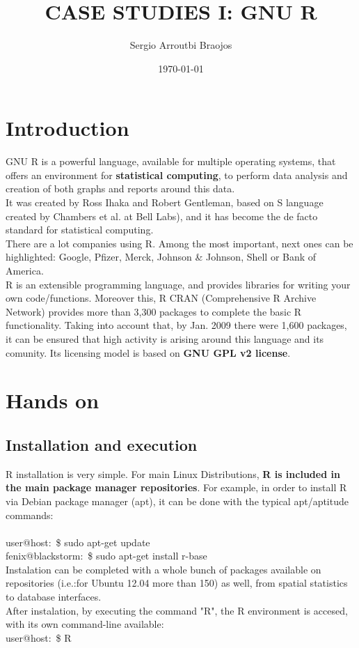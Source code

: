 \documentclass[11pt]{article}
\title{\textbf{CASE STUDIES I: GNU R}}
\author{Sergio Arroutbi Braojos}
\date{\today}
\begin{document}
\maketitle

\section{Introduction}
GNU R is a powerful language, available for multiple operating systems, that offers an environment for \textbf{statistical computing}, to perform data analysis and creation of both graphs and reports around this data.\\
It was created by Ross Ihaka and Robert Gentleman, based on S language created by Chambers et al. at Bell Labs), and it has become the de facto standard for statistical computing.\\
There are a lot companies using R. Among the most important, next ones can be highlighted: Google, Pfizer, Merck, Johnson \& Johnson, Shell or Bank of America.\\
R is an extensible programming language, and provides libraries for writing your own code/functions. Moreover this, R CRAN (Comprehensive R Archive Network) provides more than 3,300 packages to complete the basic R functionality. Taking into account that, by Jan. 2009 there were 1,600 packages, it can be ensured that high activity is arising around this language and its comunity. Its licensing model is based on \textbf{GNU GPL v2 license}.

\section{Hands on}
\subsection{Installation and execution}
R installation is very simple. For main Linux Distributions, \textbf{R is included in the main package manager repositories}. For example, in order to install R via Debian package manager (apt), it can be done with the typical apt/aptitude commands:\\
\\
user@host:~\$ sudo apt-get update\\
fenix@blackstorm:~\$ sudo apt-get install r-base\\
Instalation can be completed with a whole bunch of packages available on repositories (i.e.:for Ubuntu 12.04 more than 150) as well, from spatial statistics to database interfaces.\\
After instalation, by executing the command "R", the R environment is accesed, with its own command-line available:\\
user@host:~\$ R\\
\end{document}
